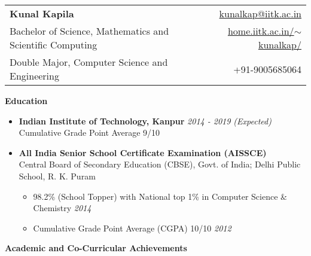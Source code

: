 \documentclass[letterpaper,11pt]{article}
\begin{document}
{\selectfont
\begin{tabular*}{7.5in}{l@{\extracolsep{\fill}}r}
    \textbf{\Large Kunal Kapila} & \href{mailto:kunalkap@iitk.ac.in}{kunalkap@iitk.ac.in}\\
    Bachelor of Science, Mathematics and Scientific Computing & \href{http://home.iitk.ac.in/~kunalkap/}{home.iitk.ac.in/$\sim$kunalkap/}\\
    Double Major, Computer Science and Engineering & +91-9005685064\\
    \hline
\end{tabular*}
\vspace{5pt}

\Large{\textbf{Education}}
\small
\vspace{-1pt}
\begin{itemize}
    \item
        \textbf{Indian Institute of Technology, Kanpur} \hfill \textit{2014 - 2019 (Expected)}\\
        Cumulative Grade Point Average 9/10\\
    \vspace{-3pt}
    \item
        \textbf{All India Senior School Certificate Examination (AISSCE)}\\
        Central Board of Secondary Education (CBSE), Govt. of India; Delhi Public School, R. K. Puram\\
        \vspace{-4pt}
        \begin{itemize}
            \item 98.2\% (School Topper) with National top 1\% in Computer Science \& Chemistry \hfill \textit{2014}\\
            \vspace{-2pt}
            \item Cumulative Grade Point Average (CGPA) 10/10 \hfill\textit{2012}\\
            \vspace{-2pt}
        \end{itemize}
\end{itemize}

\vspace{-1pt}
\Large{\textbf{Academic and Co-Curricular Achievements}}
\small
\vspace{-5pt}

}
\end{document}
